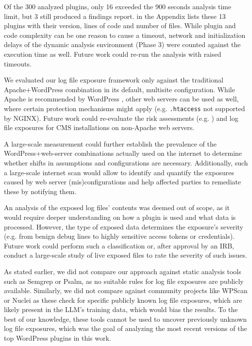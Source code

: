 \documentclass[sigconf]{acmart}
\begin{document}
Of the 300 analyzed plugins, only 16 exceeded the 900 seconds analysis time limit, but 3 still produced a findings report.  in the Appendix lists these 13 plugins with their version, lines of code and number of files. While plugin and code complexity can be one reason to cause a timeout, network and initialization delays of the dynamic analysis environment (Phase 3) were counted against the execution time as well. Future work could re-run the analysis with raised timeouts.

We evaluated our log file exposure framework only against the traditional Apache+WordPress combination in its default, multisite configuration. While Apache is recommended by WordPress \cite{wordpressWordPressServers}, other web servers can be used as well, where certain protection mechanisms might apply (e.g. \texttt{.htaccess} not supported by NGINX). 
Future work could re-evaluate the risk assessments (e.g. ) and log file exposures for CMS installations on non-Apache web servers.

A large-scale measurement could further establish the prevalence of the WordPress+web-server combinations actually used on the internet to determine whether shifts in assumptions and configurations are necessary.
Additionally, such a large-scale internet scan would allow to identify and quantify the exposures caused by web server (mis)configurations and help affected parties to remediate these by notifying them.

An analysis of the exposed log files' contents was deemed out of scope, as it would require deeper understanding on how a plugin is used and what data is processed. However, the type of exposed data determines the exposure's severity (e.g. from benign debug lines to highly sensitive access tokens or credentials). Future work could perform such a classification or, after approval by an IRB, conduct a large-scale study of live exposed files to rate the severity of such issues.

As stated earlier, we did not compare our approach against static analysis tools such as Semgrep or Psalm, as no suitable rules for log file exposures are publicly available. Similarly, we did not compare against community projects like WPScan or Nuclei as these check for specific publicly known log file exposures, which are likely present in the LLM's training data, which would bias the results. To the best of our knowledge, these tools cannot be used to uncover previously unknown log file exposures, which was the goal of analyzing the most recent versions of the top WordPress plugins in this work.  
\end{document}
